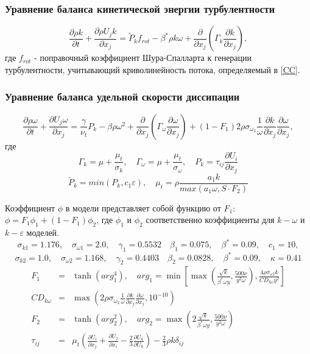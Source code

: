 		\subsubsection{Уравнение баланса кинетической энергии турбулентности}
				\begin{equation}
				\frac{\partial \rho k}{\partial t} + \frac{\partial \rho U_j k}{\partial x_j} = \tilde{P}_k f_{rot} - \beta^* \rho k \omega + \frac{\partial}{\partial x_j}(\Gamma_k \frac{\partial k}{\partial x_j}),
				\end{equation}
				где $f_{rot}$ - поправочный коэффициент Шура-Спалларта к генерации турбулентности, учитывающий криволинейность потока, определяемый в \ref{CC}.
		\subsubsection{Уравнение баланса удельной скорости диссипации}
			\begin{equation}
				\frac{\partial \rho \omega}{\partial t} + \frac{\partial U_j \omega}{\partial x_j} = \frac{\gamma}{\nu_t}P_k - \beta\rho\omega^2 + \frac{\partial}{\partial x_j}(\Gamma_{\omega}\frac{\partial \omega}{\partial x_j}) + (1-F_1)2\rho \sigma_{\omega_2}\frac{1}{\omega}\frac{\partial k}{\partial x_j}\frac{\partial \omega}{\partial x_j},
			\end{equation}
			где
			\begin{equation}
				\Gamma_k = \mu + \frac{\mu_t}{\sigma_k}, \quad \Gamma_{\omega} = \mu + \frac{\mu_t}{\sigma_{\omega}}, \quad P_k = \tau_{ij}\frac{\partial U_i}{\partial x_j}
			\end{equation}
			$$
			 \tilde{P}_k = min(P_k, c_1\varepsilon), \quad \mu_t=\rho\frac{a_1 k}{max(a_1\omega, S \cdot F_2)}
			$$
			
			Коэффициент $\phi$ в модели представляет собой функцию от $F_1$: $\phi = F_1\phi_1 + (1-F_1)\phi_2$, где $\phi_1$ и $\phi_2$ соответственно коэффициенты для $k-\omega$ и $k-\varepsilon$ моделей.
			$$
				\sigma_{k1} = 1.176, \quad \sigma_{\omega 1} = 2.0, \quad \gamma_1 = 0.5532 \quad \beta_1=0.075, \quad \beta^*=0.09, \quad c_1 = 10,
			$$
			$$
				\sigma_{k2} = 1.0, \quad \sigma_{\omega 2} = 1.168, \quad \gamma_2 = 0.4403 \quad \beta_2=0.0828, \quad \beta^*=0.09, \quad \kappa = 0.41
			$$
			\begin{eqnarray}
				\nonumber F_1 &=& \tanh{(arg_1^4)}, \quad arg_1 = \min\left[\max\left(\frac{\sqrt{k}}{\beta^*\omega y},\frac{500 \nu}{y^2 \omega} \right), \frac{4\rho\sigma_{\omega 2}k}{CD_{k\omega}y^2}\right] \\ \nonumber CD_{k\omega} &=& \max\left( 2\rho\sigma_{\omega_2}\frac{1}{\omega}\frac{\partial k}{\partial x_j}\frac{\partial \omega}{\partial x_j},10^{-10} \right) \\
				F_2 &=& \tanh{(arg_2^2)}, \quad arg_2 = \max\left(2\frac{\sqrt{k}}{\beta^*\omega y},\frac{500 \nu}{y^2\omega}\right) \\
				\nonumber \tau_{ij} &=& \mu_t\left( \frac{\partial U_i}{\partial x_j} + \frac{\partial U_j}{\partial x_i} - \frac{2}{3}\frac{\partial U_k}{\partial U_k}\right) - \frac{2}{3}\rho k \delta_{ij}
			\end{eqnarray}
